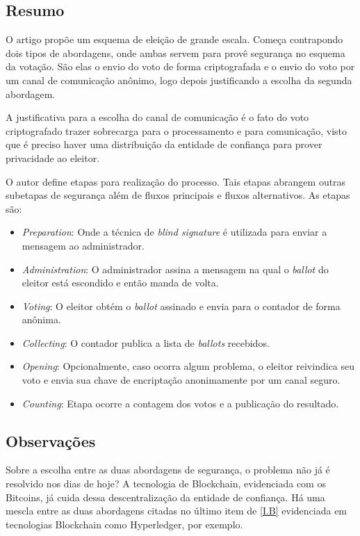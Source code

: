 \documentclass[letterpaper, 12 pt, conference]{ieeeconf}
\begin{document}
    \subsection{Resumo}
    O artigo propõe um esquema de eleição de grande escala. Começa contrapondo dois tipos de abordagens, onde ambas servem para provê segurança no esquema da votação. São elas o envio do voto de forma criptografada e o envio do voto por um canal de comunicação anônimo, logo depois justificando a escolha da segunda abordagem.

    A justificativa para a escolha do canal de comunicação é o fato do voto criptografado trazer sobrecarga para o processamento e para comunicação, visto que é preciso haver uma distribuição da entidade de confiança para prover privacidade ao eleitor. 
    
    O autor define etapas para realização do processo. Tais etapas abrangem outras subetapas de segurança além de fluxos principais e fluxos alternativos. As etapas são:
        \begin{itemize}
            \item \textit{Preparation}: Onde a técnica de \textit{blind signature} é utilizada para enviar a mensagem ao administrador. 
            \item \textit{Administration}: O administrador assina a mensagem na qual o \textit{ballot} do eleitor está escondido e então manda de volta.
            \item \textit{Voting}: O eleitor obtém o \textit{ballot} assinado e envia para o contador de forma anônima.
            \item \textit{Collecting}: O contador publica a lista de \textit{ballots} recebidos. 
            \item \textit{Opening}: Opcionalmente, caso ocorra algum problema, o eleitor reivindica seu voto e envia sua chave de encriptação anonimamente por um canal seguro.
            \item \textit{Counting}: Etapa ocorre a contagem dos votos e a publicação do resultado.
        \end{itemize}
        
    \subsection{Observações}
    Sobre a escolha entre as duas abordagens de segurança, o problema não já é resolvido nos dias de hoje? A tecnologia de Blockchain, evidenciada com os Bitcoins, já cuida dessa descentralização da entidade de confiança. Há uma mescla entre as duas abordagens citadas no último item de \ref{I.B}  evidenciada em tecnologias Blockchain como Hyperledger, por exemplo.
\end{document}
